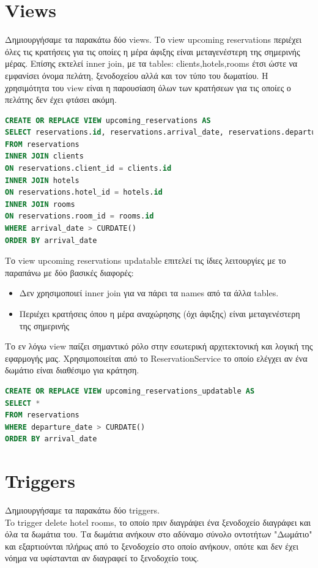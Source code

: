 \documentclass[a4paper,12pt]{article}
\begin{document}
\section{Views}
Δημιουργήσαμε τα παρακάτω δύο views.
Το view upcoming reservations περιέχει όλες τις κρατήσεις για τις οποίες η μέρα άφιξης είναι μεταγενέστερη της σημερινής μέρας. Επίσης εκτελεί inner join, με τα tables: clients,hotels,rooms έτσι ώστε να εμφανίσει όνομα πελάτη, ξενοδοχείου αλλά και τον τύπο του δωματίου. Η χρησιμότητα του view είναι η παρουσίαση όλων των κρατήσεων για τις οποίες ο πελάτης δεν έχει φτάσει ακόμη.

\begin{lstlisting}[language=SQL]
CREATE OR REPLACE VIEW upcoming_reservations AS
SELECT reservations.id, reservations.arrival_date, reservations.departure_date, reservations.created_at, reservations.updated_at, clients.first_name, clients.last_name, hotels.name, rooms.room_type
FROM reservations
INNER JOIN clients
ON reservations.client_id = clients.id
INNER JOIN hotels
ON reservations.hotel_id = hotels.id
INNER JOIN rooms
ON reservations.room_id = rooms.id
WHERE arrival_date > CURDATE()
ORDER BY arrival_date
\end{lstlisting}

Το view upcoming reservations updatable επιτελεί τις ίδιες λειτουργίες με το παραπάνω με δύο βασικές διαφορές:
\begin{itemize}
  \item Δεν χρησιμοποιεί inner join για να πάρει τα names από τα άλλα tables.
  \item Περιέχει κρατήσεις όπου η μέρα αναχώρησης (όχι άφιξης) είναι μεταγενέστερη της σημερινής
\end{itemize}
Το εν λόγω view παίζει σημαντικό ρόλο στην εσωτερική αρχιτεκτονική και λογική της εφαρμογής μας. Χρησιμοποιείται από το ReservationService το οποίο ελέγχει αν ένα δωμάτιο είναι διαθέσιμο για κράτηση.

\begin{lstlisting}[language=SQL]
CREATE OR REPLACE VIEW upcoming_reservations_updatable AS
SELECT *
FROM reservations
WHERE departure_date > CURDATE()
ORDER BY arrival_date
\end{lstlisting}

\section{Triggers}
Δημιουργήσαμε τα παρακάτω δύο triggers.\\
To trigger delete hotel rooms, το οποίο πριν διαγράψει ένα ξενοδοχείο διαγράφει και όλα τα δωμάτια του. Τα δωμάτια ανήκουν στο  αδύναμο σύνολο οντοτήτων "Δωμάτιο" και εξαρτιούνται πλήρως από το ξενοδοχείο στο οποίο ανήκουν, οπότε και δεν έχει νόημα να υφίστανται αν διαγραφεί το ξενοδοχείο τους.
\end{document}
